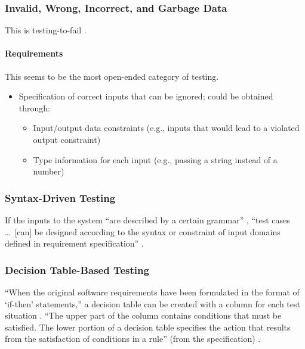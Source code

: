 \subsubsection[Invalid, Wrong, Incorrect, and Garbage Data]{Invalid, Wrong,
      Incorrect, and Garbage Data \citep[pp.~78-79]{Patton2006}}

This is testing-to-fail \citep[p.~77]{Patton2006}.

\paragraph{Requirements}
This seems to be the most open-ended category of testing.
\begin{itemize}
      \item Specification of correct inputs that can be ignored;
            could be obtained through:
            \begin{itemize}
                  \item Input/output data constraints (e.g., inputs that would
                        lead to a violated output constraint)
                  \item Type information for each input (e.g., passing a string
                        instead of a number)
            \end{itemize}
\end{itemize}

\subsubsection[Syntax-Driven Testing]{Syntax-Driven Testing
      \citep[pp.~448-449]{PetersAndPedrycz2000}}

If the inputs to the system ``are described by a certain grammar''
\citep[p.~448]{PetersAndPedrycz2000}, ``test cases \dots\ [can] be designed
according to the syntax or constraint of input domains defined in requirement
specification'' \citep[p.~260]{IntanaEtAl2020}
.

\subsubsection[Decision Table-Based Testing]{Decision Table-Based Testing
      \citep[pp.~448,~450-453]{PetersAndPedrycz2000}}

``When the original software requirements have been formulated in the format of
`if-then' statements,'' a decision table can be created with a column for each
test situation \citep[p.~448]{PetersAndPedrycz2000}. ``The upper part of the
column contains conditions that must be satisfied. The lower portion of a
decision table specifies the action that results from the satisfaction of
conditions in a rule'' (from the specification) \citep[p.~450]{PetersAndPedrycz2000}.

